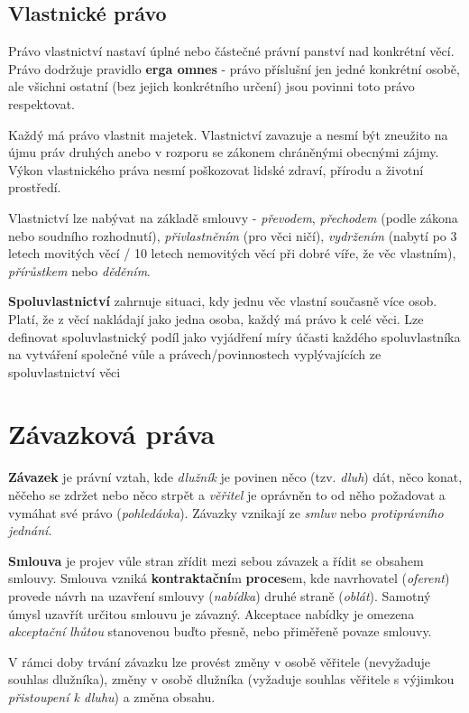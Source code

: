 \documentclass[twoside,12pt]{article}
\begin{document}
\subsection{Vlastnické právo}

Právo vlastnictví nastaví úplné nebo částečné právní panství nad konkrétní věcí. Právo dodržuje pravidlo \textbf{erga omnes} - právo příslušní jen jedné konkrétní osobě, ale všichni ostatní (bez jejich konkrétního určení) jsou povinni toto právo respektovat.

Každý má právo vlastnit majetek. Vlastnictví zavazuje a nesmí být zneužito na újmu práv druhých anebo v rozporu se zákonem chráněnými obecnými zájmy. Výkon vlastnického práva nesmí poškozovat lidské zdraví, přírodu a životní prostředí.

Vlastnictví lze nabývat na základě smlouvy - \textit{převodem}, \textit{přechodem} (podle zákona nebo soudního rozhodnutí), \textit{přivlastněním} (pro věci ničí), \textit{vydržením} (nabytí po 3 letech movitých věcí / 10 letech nemovitých věcí při dobré víře, že věc vlastním), \textit{přírůstkem} nebo \textit{děděním}.

\textbf{Spoluvlastnictví} zahrnuje situaci, kdy jednu věc vlastní současně více osob. Platí, že z věcí nakládají jako jedna osoba, každý má právo k celé věci. Lze definovat spoluvlastnický podíl jako vyjádření míry účasti každého spoluvlastníka na vytváření společné vůle a právech/povinnostech vyplývajících ze spoluvlastnictví věci

\section{Závazková práva}

\textbf{Závazek} je právní vztah, kde \textit{dlužník} je povinen něco (tzv. \textit{dluh}) dát, něco konat, něčeho se zdržet nebo něco strpět a \textit{věřitel} je oprávněn to od něho požadovat a vymáhat své právo (\textit{pohledávka}). Závazky vznikají ze \textit{smluv} nebo \textit{protiprávního jednání}.

\textbf{Smlouva} je projev vůle stran zřídit mezi sebou závazek a řídit se obsahem smlouvy. Smlouva vzniká \textbf{kontraktační}m \textbf{proces}em, kde navrhovatel (\textit{oferent}) provede návrh na uzavření smlouvy (\textit{nabídka}) druhé straně (\textit{oblát}). Samotný úmysl uzavřít určitou smlouvu je závazný. Akceptace nabídky je omezena \textit{akceptační lhůtou} stanovenou buďto přesně, nebo přiměřeně povaze smlouvy.

V rámci doby trvání závazku lze provést změny v osobě věřitele (nevyžaduje souhlas dlužníka), změny v osobě dlužníka (vyžaduje souhlas věřitele s výjimkou \textit{přistoupení k dluhu}) a změna obsahu.
\end{document}
